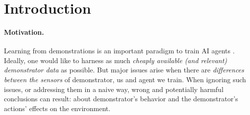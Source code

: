 \documentclass[letterpaper]{article} %
\theoremstyle{definition}%
\theoremstyle{definition}
\newcommand{\todo}[1]{\textcolor{red}{#1}}
\begin{document}
%



\section{Introduction}\label{sec:intro}

%


\paragraph{Motivation.}
Learning from demonstrations is an important paradigm to train AI agents \cite{argall2009survey,schaal1999imitation,ho2016generative,jeon2018bayesian}.
Ideally, one would like to harness as much \emph{cheaply available (and relevant) demonstrator data} as possible.
But major issues arise when there are \emph{differences between the sensors} of demonstrator, us and agent we train.
When ignoring such issues, or addressing them in a naive way, wrong and potentially harmful conclusions can result: about demonstrator's behavior and the demonstrator's actions' effects on the environment.%
\end{document}
